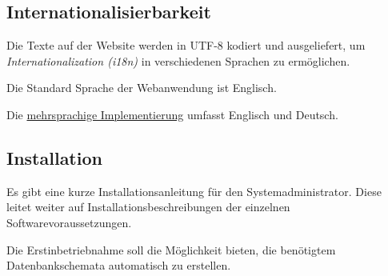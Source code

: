 \subsection{Internationalisierbarkeit}

\begin{description}
	 Die Texte auf der Website werden in UTF-8 kodiert
	und ausgeliefert, um \textit{Internationalization (i18n)} in verschiedenen Sprachen zu ermöglichen.

	 Die Standard Sprache der Webanwendung ist Englisch.

	 Die \hyperref[funkt:020]{mehrsprachige Implementierung} umfasst Englisch und Deutsch.
 \end{description}

\subsection{Installation}

\begin{description}
	 Es gibt eine kurze Installationsanleitung für den Systemadministrator. Diese leitet weiter auf Installationsbeschreibungen der einzelnen Softwarevoraussetzungen.

	 Die Erstinbetriebnahme soll die Möglichkeit bieten, die benötigtem Datenbankschemata automatisch zu erstellen.
\end{description}
